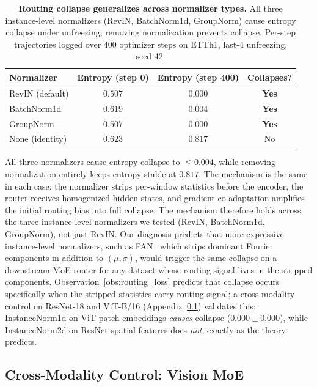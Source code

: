 \documentclass{article}
\begin{document}
\begin{table}[!htbp]
\centering
\caption{\textbf{Routing collapse generalizes across normalizer types.} All three instance-level normalizers (RevIN, BatchNorm1d, GroupNorm) cause entropy collapse under unfreezing; removing normalization prevents collapse. Per-step trajectories logged over 400 optimizer steps on ETTh1, last-4 unfreezing, seed 42.}
\label{tab:norm_generalization}
\small
\begin{tabular}{@{}lccc@{}}
\toprule
Normalizer & Entropy (step 0) & Entropy (step 400) & Collapses? \\
\midrule
RevIN (default) & $0.507$ & $0.000$ & \textbf{Yes} \\
BatchNorm1d & $0.619$ & $0.004$ & \textbf{Yes} \\
GroupNorm & $0.507$ & $0.000$ & \textbf{Yes} \\
\midrule
None (identity) & $0.623$ & $0.817$ & No \\
\bottomrule
\end{tabular}
\end{table}

All three normalizers cause entropy collapse to ${\leq}0.004$, while removing normalization entirely keeps entropy stable at $0.817$. The mechanism is the same in each case: the normalizer strips per-window statistics before the encoder, the router receives homogenized hidden states, and gradient co-adaptation amplifies the initial routing bias into full collapse. The mechanism therefore holds across the three instance-level normalizers we tested (RevIN, BatchNorm1d, GroupNorm), not just RevIN. Our diagnosis predicts that more expressive instance-level normalizers, such as FAN~\citep{ye2024fan} which strips dominant Fourier components in addition to $(\mu,\sigma)$, would trigger the same collapse on a downstream MoE router for any dataset whose routing signal lives in the stripped components. Observation~\ref{obs:routing_loss} predicts that collapse occurs specifically when the stripped statistics carry routing signal; a cross-modality control on ResNet-18 and ViT-B/16 (Appendix~\ref{app:vision_moe}) validates this: InstanceNorm1d on ViT patch embeddings \emph{causes} collapse ($0.000\pm0.000$), while InstanceNorm2d on ResNet spatial features does \emph{not}, exactly as the theory predicts.

\subsection{Cross-Modality Control: Vision MoE}
\label{app:vision_moe}
\end{document}
